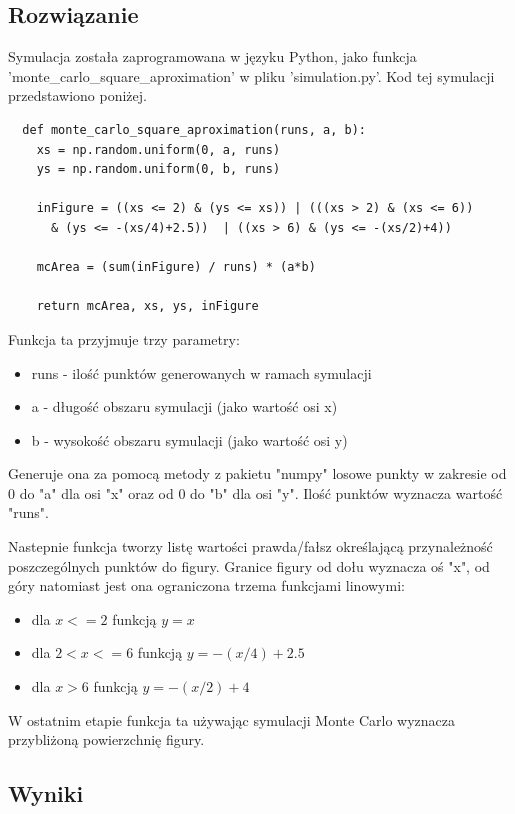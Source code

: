\documentclass[12pt,oneside,a4paper]{book} %
\theoremstyle{break}
\begin{document}
\subsection*{Rozwiązanie}

Symulacja została zaprogramowana w języku Python, jako funkcja\\ 'monte\_carlo\_square\_aproximation' w pliku 'simulation.py'.
Kod tej symulacji przedstawiono poniżej.
\begin{verbatim}
  def monte_carlo_square_aproximation(runs, a, b):
    xs = np.random.uniform(0, a, runs)
    ys = np.random.uniform(0, b, runs)

    inFigure = ((xs <= 2) & (ys <= xs)) | (((xs > 2) & (xs <= 6)) 
      & (ys <= -(xs/4)+2.5))  | ((xs > 6) & (ys <= -(xs/2)+4))

    mcArea = (sum(inFigure) / runs) * (a*b)

    return mcArea, xs, ys, inFigure
\end{verbatim}

Funkcja ta przyjmuje trzy parametry:
\begin{itemize}
  \item runs - ilość punktów generowanych w ramach symulacji
  \item a - długość obszaru symulacji (jako wartość osi x)
  \item b - wysokość obszaru symulacji (jako wartość osi y)
\end{itemize}

Generuje ona za pomocą metody z pakietu "numpy" losowe punkty w zakresie od 0 do "a" dla osi "x" oraz od 0 do "b" dla osi "y". Ilość punktów wyznacza wartość "runs".

Nastepnie funkcja tworzy listę wartości prawda/fałsz określającą przynależność poszczególnych punktów do figury. Granice figury od dołu wyznacza oś "x", od góry natomiast jest ona ograniczona trzema funkcjami linowymi:

\begin{itemize}
  \item dla $x <= 2$ funkcją $y = x$
  \item dla $2 < x <= 6$ funkcją $y = -(x/4) + 2.5 $
  \item dla $x > 6$ funkcją $y = -(x/2) + 4$
\end{itemize}

W ostatnim etapie funkcja ta używając symulacji Monte Carlo wyznacza przybliżoną powierzchnię figury.

\subsection*{Wyniki}
\end{document}

